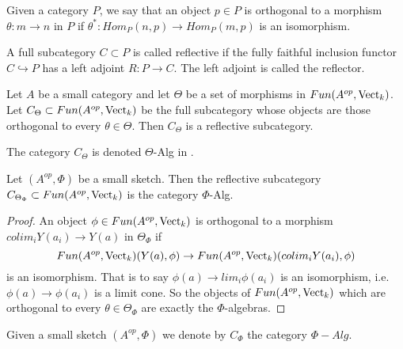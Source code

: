 \begin{definition}

Given a category $P$, we say that an object $p\in P$ is orthogonal to a morphism $\theta:m\to n$ in $P$ if $\theta^*:Hom_P(n,p)\to Hom_P(m,p)$ is an isomorphism.\end{definition}

\begin{definition}
A full subcategory $C\subset P$ is called reflective if the fully faithful inclusion functor $C\hookrightarrow P$ has a left adjoint $R:P\to C$. The left adjoint is called the reflector.\end{definition}

\begin{theorem}\cite[Theorem 6.5]{kelly/basic-concepts-enriched}\label{reflective}

\noindent Let $A$ be a small category and let $\Theta$ be a set of morphisms in $Fun(A^{op},\operatorname{Vect}_k)$. Let $C_{\Theta}\subset Fun(A^{op},\operatorname{Vect}_k)$ be the full subcategory whose objects are those orthogonal to every $\theta\in\Theta$. Then $C_{\Theta}$ is a reflective subcategory.\end{theorem}

\begin{remark}
 The category $C_{\Theta}$ is denoted $\Theta$-Alg in \cite{kelly/basic-concepts-enriched}.\end{remark}


\begin{lemma}\cite[Theorem 6.11]{kelly/basic-concepts-enriched}
 Let $(A^{op},\Phi)$ be a small sketch. Then the reflective subcategory $C_{\Theta_{\Phi}}\subset Fun(A^{op},\operatorname{Vect}_k)$ is the category $\Phi$-Alg.\end{lemma}

 \begin{proof} An object $\phi \in Fun(A^{op},\operatorname{Vect}_k)$ is orthogonal to a morphism $colim_i Y(a_i)\to Y(a)$ in $\Theta_{\Phi}$ if $$Fun(A^{op},\operatorname{Vect}_k)(Y(a),\phi)\to Fun(A^{op},\operatorname{Vect}_k)(colim_i Y(a_i),\phi)$$ is an isomorphism. That is to say $\phi(a)\to lim_i \phi(a_i)$ is an isomorphism, i.e. $\phi(a)\to \phi(a_i)$ is a limit cone. So the objects of $Fun(A^{op},\operatorname{Vect}_k)$ which are orthogonal to every $\theta\in \Theta_{\Phi}$ are exactly the $\Phi$-algebras. \end{proof}

\begin{definition}
Given a small sketch $(A^{op},\Phi)$ we denote by $C_{\Phi}$ the category $\Phi-Alg$.
\end{definition}


